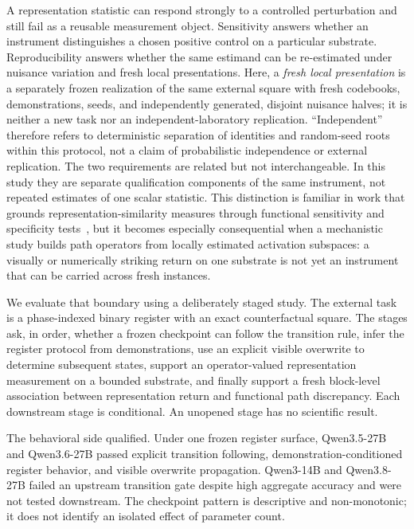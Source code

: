 \documentclass[10pt,a4paper]{article}
\begin{document}
A representation statistic can respond strongly to a controlled perturbation and still fail as a reusable measurement object. Sensitivity answers whether an instrument distinguishes a chosen positive control on a particular substrate. Reproducibility answers whether the same estimand can be re-estimated under nuisance variation and fresh local presentations. Here, a \emph{fresh local presentation} is a separately frozen realization of the same external square with fresh codebooks, demonstrations, seeds, and independently generated, disjoint nuisance halves; it is neither a new task nor an independent-laboratory replication. ``Independent'' therefore refers to deterministic separation of identities and random-seed roots within this protocol, not a claim of probabilistic independence or external replication. The two requirements are related but not interchangeable. In this study they are separate qualification components of the same instrument, not repeated estimates of one scalar statistic. This distinction is familiar in work that grounds representation-similarity measures through functional sensitivity and specificity tests~\cite{ding2021}, but it becomes especially consequential when a mechanistic study builds path operators from locally estimated activation subspaces: a visually or numerically striking return on one substrate is not yet an instrument that can be carried across fresh instances.

We evaluate that boundary using a deliberately staged study. The external task is a phase-indexed binary register with an exact counterfactual square. The stages ask, in order, whether a frozen checkpoint can follow the transition rule, infer the register protocol from demonstrations, use an explicit visible overwrite to determine subsequent states, support an operator-valued representation measurement on a bounded substrate, and finally support a fresh block-level association between representation return and functional path discrepancy. Each downstream stage is conditional. An unopened stage has no scientific result.

The behavioral side qualified. Under one frozen register surface, Qwen3.5-27B and Qwen3.6-27B passed explicit transition following, demonstration-conditioned register behavior, and visible overwrite propagation. Qwen3-14B and Qwen3.8-27B failed an upstream transition gate despite high aggregate accuracy and were not tested downstream. The checkpoint pattern is descriptive and non-monotonic; it does not identify an isolated effect of parameter count.
\end{document}
